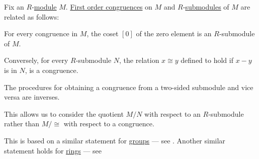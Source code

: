 \begin{proposition}\label{thm:submodules_and_congruences}
  Fix an \( R \)-\hyperref[def:module]{module} \( M \). \hyperref[def:first_order_congruence]{First order congruences} on \( M \) and \( R \)-\hyperref[def:module/submodel]{submodules} of \( M \) are related as follows:
  \begin{thmenum}
     For every congruence in \( M \), the coset \( [0] \) of the zero element is an \( R \)-submodule of \( M \).

     Conversely, for every \( R \)-submodule \( N \), the relation \( x \cong y \) defined to hold if \( x - y \) is in \( N \), is a congruence.

     The procedures for obtaining a congruence from a two-sided submodule and vice versa are inverses.
  \end{thmenum}
\end{proposition}
\begin{comments}
  \item This allows us to consider the quotient \( M / N \) with respect to an \( R \)-submodule rather than \( M / {\cong} \) with respect to a congruence.

  \item This is based on a similar statement for \hyperref[def:group]{groups} --- see . Another similar statement holds for \hyperref[def:ring]{rings} --- see 
\end{comments}
